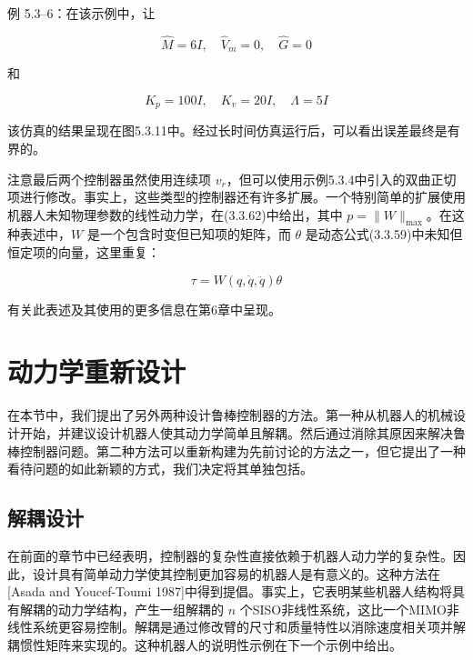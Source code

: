 \documentclass[UTF8,12pt,a4paper]{ctexart}
\begin{document}
\begin{example}[饱和控制器 2]
例 5.3--6：在该示例中，让

\begin{equation}
\hat{M} = 6I, \quad \hat{V}_m = 0, \quad \hat{G} = 0
\end{equation}

和

\begin{equation}
K_p = 100I, \quad K_v = 20I, \quad \Lambda = 5I
\end{equation}

该仿真的结果呈现在图5.3.11中。经过长时间仿真运行后，可以看出误差最终是有界的。
\end{example}

注意最后两个控制器虽然使用连续项 $v_r$，但可以使用示例5.3.4中引入的双曲正切项进行修改。事实上，这些类型的控制器还有许多扩展。一个特别简单的扩展使用机器人未知物理参数的线性动力学，在(3.3.62)中给出，其中 $p = \|W\|_{\max}$。在这种表述中，$W$ 是一个包含时变但已知项的矩阵，而 $\theta$ 是动态公式(3.3.59)中未知但恒定项的向量，这里重复：

\begin{equation}\label{eq:5.3.16}
\tau = W(q, \dot{q}, \ddot{q})\theta
\end{equation}

有关此表述及其使用的更多信息在第6章中呈现。

\section{动力学重新设计}

在本节中，我们提出了另外两种设计鲁棒控制器的方法。第一种从机器人的机械设计开始，并建议设计机器人使其动力学简单且解耦。然后通过消除其原因来解决鲁棒控制器问题。第二种方法可以重新构建为先前讨论的方法之一，但它提出了一种看待问题的如此新颖的方式，我们决定将其单独包括。

\subsection{解耦设计}

在前面的章节中已经表明，控制器的复杂性直接依赖于机器人动力学的复杂性。因此，设计具有简单动力学使其控制更加容易的机器人是有意义的。这种方法在[Asada and Youcef-Toumi 1987]中得到提倡。事实上，它表明某些机器人结构将具有解耦的动力学结构，产生一组解耦的 $n$ 个SISO非线性系统，这比一个MIMO非线性系统更容易控制。解耦是通过修改臂的尺寸和质量特性以消除速度相关项并解耦惯性矩阵来实现的。这种机器人的说明性示例在下一个示例中给出。
\end{document}
